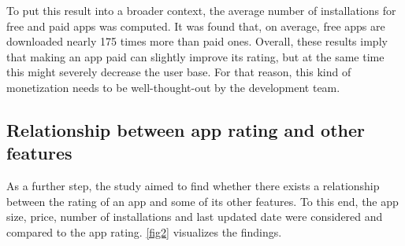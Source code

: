 \documentclass{article}
\begin{document}
To put this result into a broader context, the average number of installations for free and paid apps was computed. It was found that, on average, free apps are downloaded nearly 175 times more than paid ones. Overall, these results imply that making an app paid can slightly improve its rating, but at the same time this might severely decrease the user base. For that reason, this kind of monetization needs to be well-thought-out by the development team.


\subsection{Relationship between app rating and other features}
\label{other_features}

As a further step, the study aimed to find whether there exists a relationship between the rating of an app and some of its other features. To this end, the app size, price, number of installations and last updated date were considered and compared to the app rating. \cref{fig2} visualizes the findings. 
\end{document}
